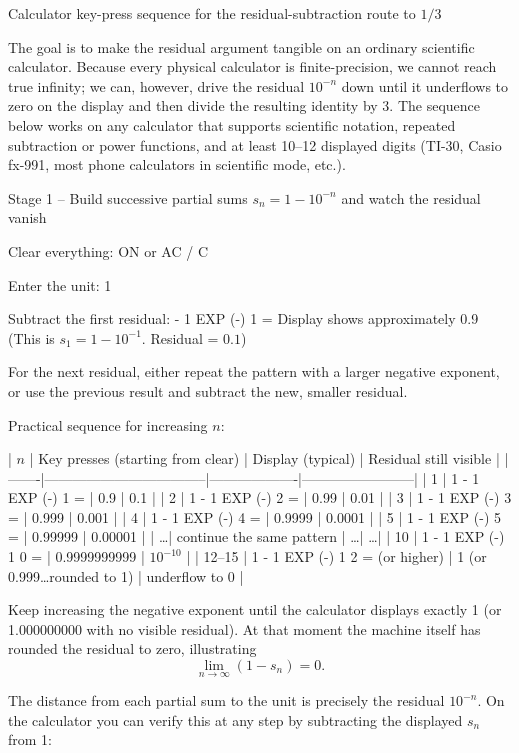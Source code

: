 Calculator key-press sequence for the residual-subtraction route to \(1/3\)

The goal is to make the residual argument tangible on an ordinary scientific calculator. Because every physical calculator is finite-precision, we cannot reach true infinity; we can, however, drive the residual \(10^{-n}\) down until it underflows to zero on the display and then divide the resulting identity by 3. The sequence below works on any calculator that supports scientific notation, repeated subtraction or power functions, and at least 10–12 displayed digits (TI-30, Casio fx-991, most phone calculators in scientific mode, etc.).

Stage 1 – Build successive partial sums \(s_n = 1 - 10^{-n}\) and watch the residual vanish

Clear everything:  
   ON or AC / C

Enter the unit:  
   1

Subtract the first residual:  
   - 1 EXP (-) 1 =  
   Display shows approximately 0.9  
   (This is \(s_1 = 1 - 10^{-1}\). Residual = \(0.1\))

For the next residual, either  
   repeat the pattern with a larger negative exponent, or  
   use the previous result and subtract the new, smaller residual.

   Practical sequence for increasing \(n\):

   | \(n\) | Key presses (starting from clear) | Display (typical) | Residual still visible |
   |-------|-----------------------------------|-------------------|------------------------|
   | 1     | 1 - 1 EXP (-) 1 = | 0.9 | 0.1 |
   | 2     | 1 - 1 EXP (-) 2 = | 0.99 | 0.01 |
   | 3     | 1 - 1 EXP (-) 3 = | 0.999 | 0.001 |
   | 4     | 1 - 1 EXP (-) 4 = | 0.9999 | 0.0001 |
   | 5     | 1 - 1 EXP (-) 5 = | 0.99999 | 0.00001 |
   | \ldots | continue the same pattern | \ldots | \ldots |
   | 10    | 1 - 1 EXP (-) 1 0 = | 0.9999999999 | \(10^{-10}\) |
   | 12–15 | 1 - 1 EXP (-) 1 2 = (or higher) | 1 (or 0.999\ldots rounded to 1) | underflow to 0 |

Keep increasing the negative exponent until the calculator displays exactly 1 (or 1.000000000 with no visible residual).  
   At that moment the machine itself has rounded the residual to zero, illustrating
   \[
   \lim_{n\to\infty}(1-s_n)=0.
   \]

The distance from each partial sum to the unit is precisely the residual \(10^{-n}\).  
On the calculator you can verify this at any step by subtracting the displayed \(s_n\) from 1:

